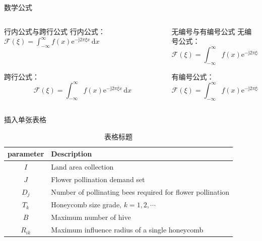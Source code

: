 \documentclass[12pt]{beamer}
\begin{document}
\begin{frame}{数学公式}
    \begin{columns}[T,onlytextwidth]
        \begin{column}{0.48\textwidth}
            \begin{block}{行内公式与跨行公式}
                行内公式：$\mathcal{F}(\xi)=\int_{-\infty}^{\infty} f(x)\mathrm{e}^{-\mathrm{j}2\pi
                \xi x}\,\mathrm{d}x$

                ~\par

                跨行公式：
                $$
                \mathcal{F}(\xi)=\int_{-\infty}^{\infty} f(x)\mathrm{e}^{-\mathrm{j}2\pi\xi x}\,\mathrm{d}x
                $$
            \end{block}
        \end{column}
        
        \begin{column}{0.48\textwidth}
            \begin{block}{无编号与有编号公式}
                无编号公式：
                \begin{equation*}
                    \mathcal{F}(\xi)=\int_{-\infty}^{\infty} f(x)\mathrm{e}^{-\mathrm{j}2\pi
                    \xi x}\,\mathrm{d}x
                \end{equation*}

                有编号公式：
                \begin{equation}
                    \mathcal{F}(\xi)=\int_{-\infty}^{\infty} f(x)\mathrm{e}^{-\mathrm{j}2\pi
                    \xi x}\,\mathrm{d}x
                \end{equation}
            \end{block}
        \end{column}
    \end{columns}
\end{frame}

\begin{frame}{插入单张表格}
    \begin{table}[H]
        \centering
        \caption{表格标题}
            \begin{tabular}{c||l}
            \toprule
            parameter  & Description \\
            \midrule
            $I$ & Land area collection \\
            $J$ & Flower pollination demand set \\
            $D_j$ & Number of pollinating bees required for flower pollination \\
            $T_k$ & Honeycomb size grade, $k = 1, 2, \cdots$ \\
            $B$ & Maximum number of hive \\
            $R_{ik}$ & Maximum influence radius of a single honeycomb \\
            \bottomrule
            \end{tabular}%
        \label{tab: 一个表}%
    \end{table}%
\end{frame}
\end{document}
